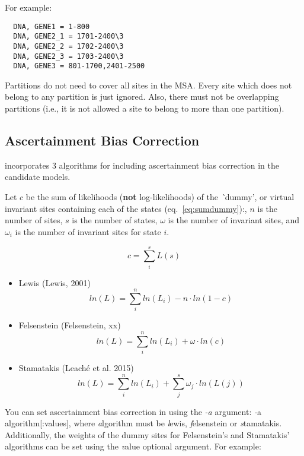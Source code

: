 For example:

{
\begin{verbatim}
  DNA, GENE1 = 1-800
  DNA, GENE2_1 = 1701-2400\3
  DNA, GENE2_2 = 1702-2400\3
  DNA, GENE2_3 = 1703-2400\3
  DNA, GENE3 = 801-1700,2401-2500
\end{verbatim}
}

Partitions do not need to cover all sites in the MSA.
Every site which does not belong to any partition is just ignored.
Also, there must not be overlapping partitions (i.e., it is not allowed a site to belong to more than one partition).

\subsection{Ascertainment Bias Correction}
\label{sec:ascbias}

{\modeltest} incorporates 3 algorithms for including ascertainment bias correction in the candidate models.

Let $c$ be the sum of likelihoods ({\bf not} log-likelihoods) of the {\emph `dummy'}, or virtual invariant sites containing each of the states (eq.~\ref{eq:sumdummy}):,
$n$ is the number of sites,
$s$ is the number of states,
$\omega$ is the number of invariant sites,
and $\omega_i$ is the number of invariant sites for state $i$.

\begin{equation}
  \label{eq:sumdummy}
  c = \sum\limits_{i}^{s}L(s)
\end{equation}

\begin{itemize}
  \item Lewis (Lewis, 2001)
    \begin{equation}
      ln(L) = \sum\limits_{i}^{n}ln(L_i) - n \cdot ln(1-c)
    \end{equation}
  \item Felsenstein (Felsenstein, xx)
    \begin{equation}
      ln(L) = \sum\limits_{i}^{n}ln(L_i) + \omega \cdot ln(c)
    \end{equation}
  \item Stamatakis (Leach\'e et al. 2015)
    \begin{equation}
      ln(L) = \sum\limits_{i}^{n}ln(L_i) + \sum\limits_{j}^{s} \omega_j \cdot ln(L(j))
    \end{equation}
\end{itemize}

You can set ascertainment bias correction in {\modeltest} using the {\it -a} argument: {\emph -a algorithm[:values]},
where {\emph algorithm} must be {\emph lewis}, {\emph felsenstein} or {\emph stamatakis}.
Additionally, the weights of the dummy sites for Felsenstein's and Stamatakis' algorithms can be set using the {\emph value} optional argument.
For example:


